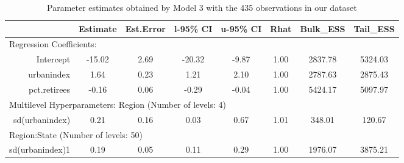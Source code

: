 \documentclass[12pt]{article}
\begin{document}
\begin{table}[ht]
	\centering
	\begin{adjustbox}{max width=\textwidth}
	\begin{tabular}{rccccccc}
		\hline
		& Estimate & Est.Error & l-95\% CI & u-95\% CI & Rhat & Bulk\_ESS & Tail\_ESS \\ 
		\hline
		 \multicolumn{8}{l}{Regression Coefficients:} \\
		Intercept & -15.02 & 2.69 & -20.32 & -9.87 & 1.00 & 2837.78 & 5324.03 \\ 
		urbanindex & 1.64 & 0.23 & 1.21 & 2.10 & 1.00 & 2787.63 & 2875.43 \\ 
		pct.retirees & -0.16 & 0.06 & -0.29 & -0.04 & 1.00 & 5424.17 & 5097.97 \\
		\midrule
		\multicolumn{8}{l}{Multilevel Hyperparameters: Region (Number of levels: 4)} \\ 
		sd(urbanindex) & 0.21 & 0.16 & 0.03 & 0.67 & 1.01 & 348.01 & 120.67 \\ 
		\midrule
		\multicolumn{8}{l}{Region:State (Number of levels: 50)}  \\
		sd(urbanindex)1 & 0.19 & 0.05 & 0.11 & 0.29 & 1.00 & 1976.07 & 3875.21 \\ 
		\hline
	\end{tabular}
	\end{adjustbox}
	\caption{Parameter estimates obtained by Model 3 with the 435 observations in our dataset}
	\label{tab:model3}
\end{table}
\end{document}
